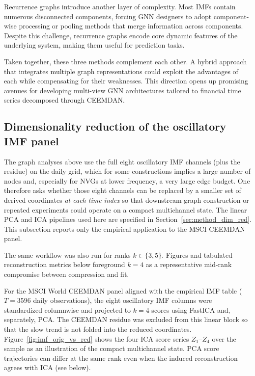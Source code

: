 \documentclass[11pt,a4paper]{article}
\begin{document}
Recurrence graphs introduce another layer of complexity. Most IMFs contain numerous disconnected components, forcing GNN designers to adopt component-wise processing or pooling methods that merge information across components. Despite this challenge, recurrence graphs encode core dynamic features of the underlying system, making them useful for prediction tasks.

Taken together, these three methods complement each other. A hybrid approach that integrates multiple graph representations could exploit the advantages of each while compensating for their weaknesses. This direction opens up promising avenues for developing multi-view GNN architectures tailored to financial time series decomposed through CEEMDAN.

\FloatBarrier

\subsection{Dimensionality reduction of the oscillatory IMF panel}
\label{sec:dim_red_imf}

The graph analyses above use the full eight oscillatory IMF channels (plus the residue) on the daily grid, which for some constructions implies a large number of nodes and, especially for NVGs at lower frequency, a very large edge budget. One therefore asks whether those eight channels can be replaced by a smaller set of derived coordinates \emph{at each time index} so that downstream graph construction or repeated experiments could operate on a compact multichannel state. The linear PCA and ICA pipelines used here are specified in Section~\ref{sec:method_dim_red}. This subsection reports only the empirical application to the MSCI CEEMDAN panel.

The same workflow was also run for ranks $k\in\{3,5\}$. Figures and tabulated reconstruction metrics below foreground $k=4$ as a representative mid-rank compromise between compression and fit.

For the MSCI World CEEMDAN panel aligned with the empirical IMF table ($T=3596$ daily observations), the eight oscillatory IMF columns were standardized columnwise and projected to $k=4$ scores using FastICA and, separately, PCA. The CEEMDAN residue was excluded from this linear block so that the slow trend is not folded into the reduced coordinates. Figure~\ref{fig:imf_orig_vs_red} shows the four ICA score series $Z_1$--$Z_4$ over the sample as an illustration of the compact multichannel state. PCA score trajectories can differ at the same rank even when the induced reconstruction agrees with ICA (see below).
\end{document}
